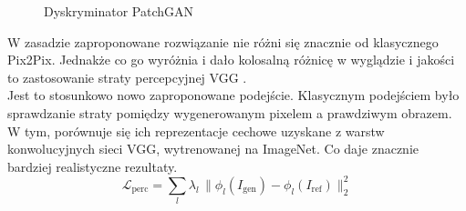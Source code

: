 \documentclass[12pt]{article}
\begin{document}
\begin{sloppypar}
{{\begin{figure}[H]
      \caption{Dyskryminator PatchGAN}
      \label{fig:discriminator}
    \end{figure}
    W zasadzie zaproponowane rozwiązanie nie różni się znacznie od klasycznego Pix2Pix. 
    Jednakże co go wyróżnia i dało kolosalną różnicę w wyglądzie i jakości to zastosowanie straty percepcyjnej VGG \cite{vgg}. \\
    Jest to stosunkowo nowo zaproponowane podejście. Klasycznym podejściem było sprawdzanie straty pomiędzy wygenerowanym pixelem a prawdziwym obrazem. 
    W tym, porównuje się ich reprezentacje cechowe uzyskane z warstw konwolucyjnych sieci VGG, wytrenowanej na ImageNet. 
    Co daje znacznie bardziej realistyczne rezultaty. \\
    \[ \mathcal{L}_{\text{perc}} = \sum_{l} \lambda_l \, \| \phi_l(I_{\text{gen}}) - \phi_l(I_{\text{ref}}) \|_2^2 \]
  }
}
\end{sloppypar}
\end{document}
